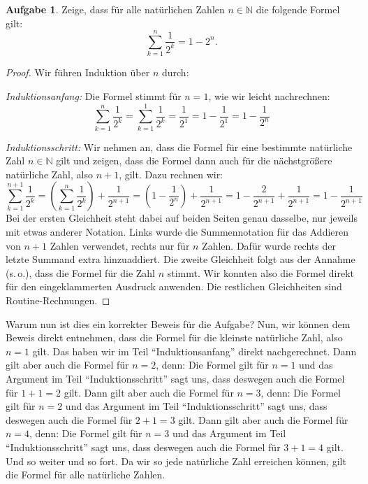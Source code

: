 \documentclass[a4paper,ngerman,12pt]{scrartcl}
\newcommand{\N}{\mathbb{N}}
\theoremstyle{definition}
\newtheorem*{aufg}{Aufgabe}
\begin{document}
\begin{aufg}
  Zeige, dass für alle natürlichen Zahlen $n \in \N$ die folgende Formel gilt:
  \[ \sum_{k=1}^n \frac{1}{2^k} = 1 - 2^n. \]
\end{aufg}

\begin{proof}
  Wir führen Induktion über $n$ durch:

  \emph{Induktionsanfang:} Die Formel stimmt für $n=1$, wie wir leicht nachrechnen:
  \[ \sum_{k=1}^n \frac{1}{2^k} = \sum_{k=1}^1 \frac{1}{2^k} = \frac{1}{2^1} = 1 - \frac{1}{2^1} = 1 - \frac{1}{2^n} \]

  \emph{Induktionsschritt:} Wir nehmen an, dass die Formel für eine bestimmte natürliche Zahl $n \in \N$ gilt und zeigen, dass die Formel dann auch für die nächstgrößere natürliche Zahl, also $n{+}1$, gilt. Dazu rechnen wir:
  \[ \sum_{k=1}^{n+1} \frac{1}{2^k} = \left( \sum_{k=1}^{n} \frac{1}{2^k} \right) + \frac{1}{2^{n+1}} = \left( 1 - \frac{1}{2^n} \right) + \frac{1}{2^{n+1}} = 1 - \frac{2}{2^{n+1}} + \frac{1}{2^{n+1}} = 1 - \frac{1}{2^{n+1}} \]
  Bei der ersten Gleichheit steht dabei auf beiden Seiten genau dasselbe, nur jeweils mit etwas anderer Notation. Links wurde die Summennotation für das Addieren von $n+1$ Zahlen verwendet, rechts nur für $n$ Zahlen. Dafür wurde rechts der letzte Summand extra hinzuaddiert. Die zweite Gleichheit folgt aus der Annahme (s.\,o.), dass die Formel für die Zahl $n$ stimmt. Wir konnten also die Formel direkt für den eingeklammerten Ausdruck anwenden. Die restlichen Gleichheiten sind Routine-Rechnungen.
\end{proof}

Warum nun ist dies ein korrekter Beweis für die Aufgabe? Nun, wir können dem Beweis direkt entnehmen, dass die Formel für die kleinste natürliche Zahl, also $n=1$ gilt. Das haben wir im Teil "`Induktionsanfang"' direkt nachgerechnet. Dann gilt aber auch die Formel für $n=2$, denn: Die Formel gilt für $n=1$ und das Argument im Teil "`Induktionsschritt"' sagt uns, dass deswegen auch die Formel für $1+1=2$ gilt. Dann gilt aber auch die Formel für $n=3$, denn: Die Formel gilt für $n=2$ und das Argument im Teil "`Induktionsschritt"' sagt uns, dass deswegen auch die Formel für $2+1=3$ gilt. Dann gilt aber auch die Formel für $n=4$, denn: Die Formel gilt für $n=3$ und das Argument im Teil "`Induktionsschritt"' sagt uns, dass deswegen auch die Formel für $3+1=4$ gilt. Und so weiter und so fort. Da wir so jede natürliche Zahl erreichen können, gilt die Formel für alle natürliche Zahlen.
\end{document}
